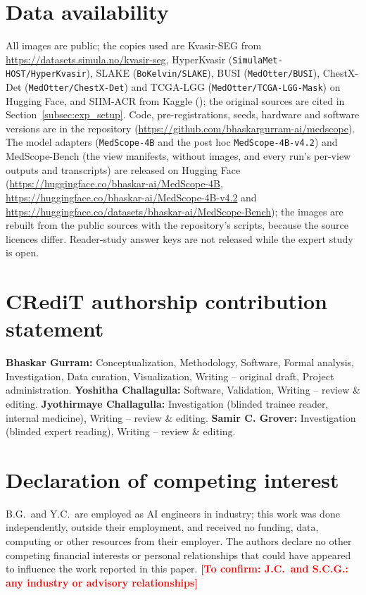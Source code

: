 \documentclass[5p,times,twocolumn,authoryear]{elsarticle}
\newcommand{\toconfirm}[1]{\textcolor{red}{\textbf{[To confirm: #1]}}}
\begin{document}
\section*{Data availability}
All images are public; the copies used are Kvasir-SEG from \url{https://datasets.simula.no/kvasir-seg}, HyperKvasir (\texttt{SimulaMet-HOST/HyperKvasir}), SLAKE (\texttt{BoKelvin/SLAKE}), BUSI (\texttt{MedOtter/BUSI}), ChestX-Det (\texttt{MedOtter/ChestX-Det}) and TCGA-LGG (\texttt{MedOtter/TCGA-LGG-Mask}) on Hugging Face, and SIIM-ACR from Kaggle (); the original sources are cited in Section~\ref{subsec:exp_setup}. Code, pre-registrations, seeds, hardware and software versions are in the repository (\url{https://github.com/bhaskargurram-ai/medscope}). The model adapters (\texttt{MedScope-4B} and the post hoc \texttt{MedScope-4B-v4.2}) and MedScope-Bench (the view manifests, without images, and every run's per-view outputs and transcripts) are released on Hugging Face (\url{https://huggingface.co/bhaskar-ai/MedScope-4B}, \url{https://huggingface.co/bhaskar-ai/MedScope-4B-v4.2} and \url{https://huggingface.co/datasets/bhaskar-ai/MedScope-Bench}); the images are rebuilt from the public sources with the repository's scripts, because the source licences differ. Reader-study answer keys are not released while the expert study is open.


\section*{CRediT authorship contribution statement}
\textbf{Bhaskar Gurram:} Conceptualization, Methodology, Software, Formal analysis, Investigation, Data curation, Visualization, Writing -- original draft, Project administration.
\textbf{Yoshitha Challagulla:} Software, Validation, Writing -- review \& editing.
\textbf{Jyothirmaye Challagulla:} Investigation (blinded trainee reader, internal medicine), Writing -- review \& editing.
\textbf{Samir C. Grover:} Investigation (blinded expert reading), Writing -- review \& editing.

\section*{Declaration of competing interest}
B.G.\ and Y.C.\ are employed as AI engineers in industry; this work was done independently, outside their employment, and received no funding, data, computing or other resources from their employer. The authors declare no other competing financial interests or personal relationships that could have appeared to influence the work reported in this paper. \toconfirm{J.C.\ and S.C.G.: any industry or advisory relationships}
\end{document}
